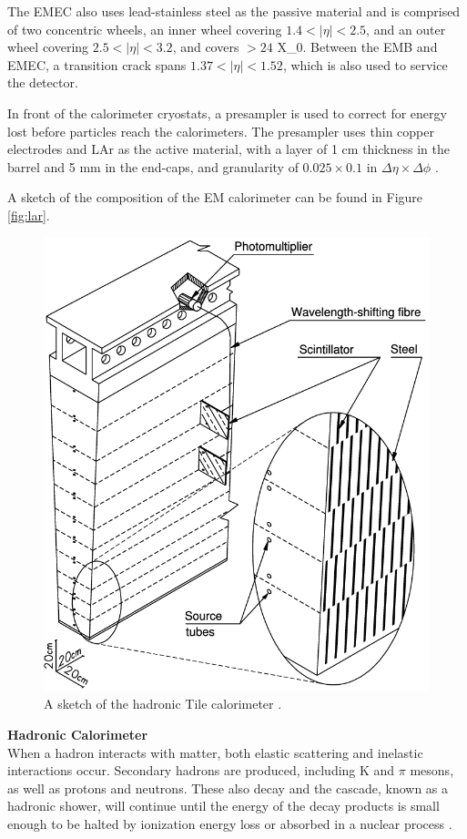 The \gls{EMEC} also uses lead-stainless steel as the passive material and is comprised of two concentric wheels, an inner wheel covering $1.4 < |\eta| < 2.5$, and an outer wheel covering $2.5 < |\eta| < 3.2$, and covers $>24$ \gls{X_0}. Between the \gls{EMB} and \gls{EMEC}, a transition crack spans $1.37 < |\eta| < 1.52$, which is also used to service the detector.

In front of the calorimeter cryostats, a presampler is used to correct for energy lost before particles reach the calorimeters. The presampler uses thin copper electrodes and \gls{LAr} as the active material, with a layer of 1 cm thickness in the barrel and 5 mm in the end-caps, and granularity of $0.025 \times 0.1$ in $\Delta\eta \times \Delta \phi$ \cite{lar-tdr}.


A sketch of the composition of the \gls{EM} calorimeter can be found in Figure \ref{fig:lar}.

\begin{figure}[!ht]
    \centering
    \includegraphics[width=.65\textwidth]{chapters/chapter2_experiment/images/tile.png}
    \caption{A sketch of the hadronic Tile calorimeter \cite{tile-tdr}.}
    \label{fig:tile}
\end{figure}


\noindent\textbf{Hadronic Calorimeter}\\
\indent When a hadron interacts with matter, both elastic scattering and inelastic interactions occur. Secondary hadrons are produced, including K and $\pi$ mesons, as well as protons and neutrons. These also decay and the cascade, known as a hadronic shower, will continue until the energy of the decay products is small enough to be halted by ionization energy loss or absorbed in a nuclear process \cite{detectors-for-radiation}.

